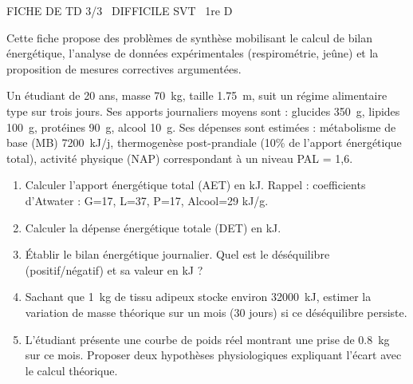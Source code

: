 \documentclass[11pt]{article}
\begin{document}
\begin{tcolorbox}[enhanced,colback=popink,colframe=popink,arc=10pt,boxrule=0pt,left=12pt,right=12pt,top=9pt,bottom=9pt]
{\color{white}\popxbold\small FICHE DE TD 3/3 \textbullet\ DIFFICILE \hfill SVT \textbullet\ 1re D\par}
\end{tcolorbox}
\vspace{4pt}
Cette fiche propose des problèmes de synthèse mobilisant le calcul de bilan énergétique, l'analyse de données expérimentales (respirométrie, jeûne) et la proposition de mesures correctives argumentées.

\begin{exercice}
Un étudiant de 20 ans, masse \SI{70}{kg}, taille \SI{1,75}{m}, suit un régime alimentaire type sur trois jours. Ses apports journaliers moyens sont : glucides \SI{350}{g}, lipides \SI{100}{g}, protéines \SI{90}{g}, alcool \SI{10}{g}. Ses dépenses sont estimées : métabolisme de base (MB) \SI{7200}{kJ/j}, thermogenèse post-prandiale (10\% de l'apport énergétique total), activité physique (NAP) correspondant à un niveau PAL = 1,6.
\begin{enumerate}
    \item Calculer l'apport énergétique total (AET) en kJ. Rappel : coefficients d'Atwater : G=17, L=37, P=17, Alcool=29 kJ/g.
    \item Calculer la dépense énergétique totale (DET) en kJ.
    \item Établir le bilan énergétique journalier. Quel est le déséquilibre (positif/négatif) et sa valeur en kJ ?
    \item Sachant que \SI{1}{kg} de tissu adipeux stocke environ \SI{32000}{kJ}, estimer la variation de masse théorique sur un mois (30 jours) si ce déséquilibre persiste.
    \item L'étudiant présente une courbe de poids réel montrant une prise de \SI{0,8}{kg} sur ce mois. Proposer deux hypothèses physiologiques expliquant l'écart avec le calcul théorique.
\end{enumerate}
\end{exercice}
\end{document}

